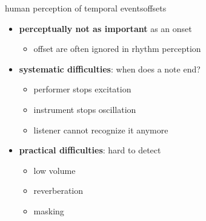         \begin{frame}{human perception of temporal events}{offsets}

            \begin{itemize}
                \item   \textbf{perceptually not as important} as an onset
                    \begin{itemize}
                        \item   offset are often ignored in rhythm perception
                    \end{itemize}
                \smallskip
                \item	\textbf{systematic difficulties}: when does a note end?
                    \begin{itemize}
                        \item	performer stops excitation
                        \item	instrument stops oscillation
                        \item	listener cannot recognize it anymore
                    \end{itemize}
                \smallskip
                \item	\textbf{practical difficulties}: hard to detect
                    \begin{itemize}
                        \item	low volume
                        \item	reverberation
                        \item	masking
                    \end{itemize}
            \end{itemize}
        \end{frame}
        
